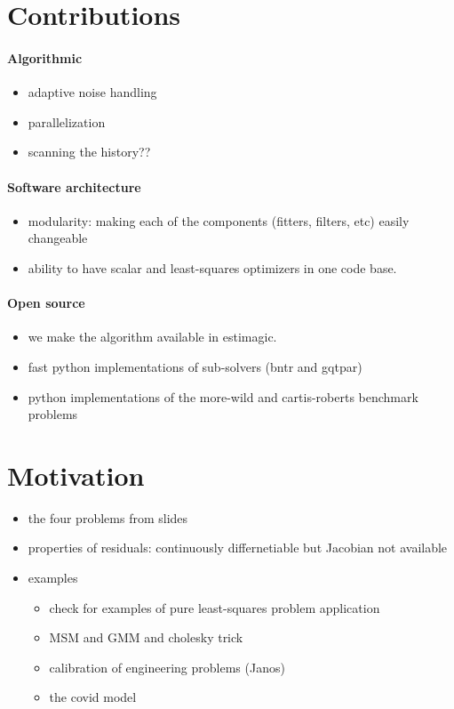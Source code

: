 \section{Contributions}
\paragraph{Algorithmic}
\begin{itemize}
    \item adaptive noise handling
    \item parallelization
    \item scanning the history??
\end{itemize}
\paragraph{Software architecture}
\begin{itemize}
    \item modularity: making each of the components (fitters, filters, etc) easily changeable
    \item ability to have scalar and least-squares optimizers in one code base.
\end{itemize}
\paragraph{Open source}
\begin{itemize}
    \item we make the algorithm available in estimagic.
    \item fast python implementations of sub-solvers (bntr and gqtpar)
    \item python implementations of the  more-wild and cartis-roberts benchmark problems
\end{itemize}

\section{Motivation}

\begin{itemize}
    \item the four problems from slides
    \item properties of residuals: continuously differnetiable but Jacobian not available
    \item examples
        \begin{itemize}
            \item check for examples of pure least-squares problem application
            \item MSM and GMM and cholesky trick
            \item calibration of engineering problems (Janos)
            \item the covid model
        \end{itemize}
\end{itemize}

